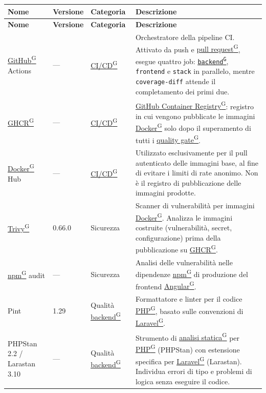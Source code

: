 \documentclass[a4paper,12pt]{article}
\providecommand{\glslink}[2]{\href{https://alittlebyte-19.github.io/Documentazione/glossario.html\#gls-#1}{\underline{#2}\textsuperscript{\scriptsize G}}}
\begin{document}
\renewcommand{\arraystretch}{1.3}
{\small
\setlength{\LTleft}{0pt}
\setlength{\LTright}{0pt}
\begin{longtable}{|p{3.5cm}|p{1.8cm}|p{2.5cm}|p{6.7cm}|}
    \hline
    \rowcolor{gray!20}
    \textbf{Nome} & \textbf{Versione} & \textbf{Categoria} & \textbf{Descrizione} \\
    \hline
    \endfirsthead
    \hline
    \rowcolor{gray!20}
    \textbf{Nome} & \textbf{Versione} & \textbf{Categoria} & \textbf{Descrizione} \\
    \hline
    \endhead
    \glslink{github}{GitHub} Actions & --- & \glslink{ci-cd-continuous-integration-continuous-deployment}{CI/CD} & Orchestratore della pipeline CI. Attivato da push e \glslink{pull-request}{pull request}, esegue quattro job: \texttt{\glslink{backend}{backend}}, \texttt{frontend} e \texttt{stack} in parallelo, mentre \texttt{coverage-diff} attende il completamento dei primi due. \\
    \hline
    \glslink{ghcr-github-container-registry}{GHCR} & --- & \glslink{ci-cd-continuous-integration-continuous-deployment}{CI/CD} & \glslink{ghcr-github-container-registry}{GitHub Container Registry}: registro in cui vengono pubblicate le immagini \glslink{docker}{Docker} solo dopo il superamento di tutti i \glslink{quality-gate}{quality gate}. \\
    \hline
    \glslink{docker}{Docker} Hub & --- & \glslink{ci-cd-continuous-integration-continuous-deployment}{CI/CD} & Utilizzato esclusivamente per il pull autenticato delle immagini base, al fine di evitare i limiti di rate anonimo. Non è il registro di pubblicazione delle immagini prodotte. \\
    \hline
    \glslink{trivy}{Trivy} & 0.66.0 & Sicurezza & Scanner di vulnerabilità per immagini \glslink{docker}{Docker}. Analizza le immagini costruite (vulnerabilità, secret, configurazione) prima della pubblicazione su \glslink{ghcr-github-container-registry}{GHCR}. \\
    \hline
    \glslink{npm}{npm} audit & --- & Sicurezza & Analisi delle vulnerabilità nelle dipendenze \glslink{npm}{npm} di produzione del frontend \glslink{angular}{Angular}. \\
    \hline
    Pint & 1.29 & Qualità \glslink{backend}{backend} & Formattatore e linter per il codice \glslink{php}{PHP}, basato sulle convenzioni di \glslink{laravel}{Laravel}. \\
    \hline
    PHPStan 2.2 / Larastan 3.10 & --- & Qualità \glslink{backend}{backend} & Strumento di \glslink{analisi-statica}{analisi statica} per \glslink{php}{PHP} (PHPStan) con estensione specifica per \glslink{laravel}{Laravel} (Larastan). Individua errori di tipo e problemi di logica senza eseguire il codice. \\

\end{longtable}}
\end{document}
